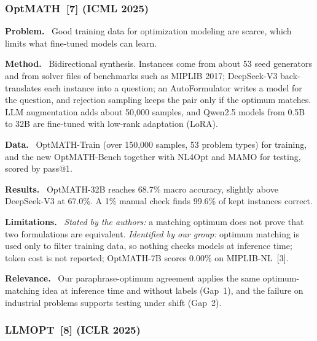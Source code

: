 \documentclass[11pt,a4paper]{article}
\newcommand{\elem}[1]{\par\noindent\textbf{#1.}~}
\begin{document}
\subsubsection[OptMATH (ICML 2025)]{OptMATH~[7] (ICML 2025)}

\elem{Problem} Good training data for optimization modeling are scarce, which limits what fine-tuned models can learn.
\elem{Method} Bidirectional synthesis. Instances come from about 53 seed generators and from solver files of benchmarks such as MIPLIB 2017; DeepSeek-V3 back-translates each instance into a question; an AutoFormulator writes a model for the question, and rejection sampling keeps the pair only if the optimum matches. LLM augmentation adds about 50,000 samples, and Qwen2.5 models from 0.5B to 32B are fine-tuned with low-rank adaptation (LoRA).
\elem{Data} OptMATH-Train (over 150,000 samples, 53 problem types) for training, and the new OptMATH-Bench together with NL4Opt and MAMO for testing, scored by pass@1.
\elem{Results} OptMATH-32B reaches 68.7\% macro accuracy, slightly above DeepSeek-V3 at 67.0\%. A 1\% manual check finds 99.6\% of kept instances correct.
\elem{Limitations} \textit{Stated by the authors:} a matching optimum does not prove that two formulations are equivalent. \textit{Identified by our group:} optimum matching is used only to filter training data, so nothing checks models at inference time; token cost is not reported; OptMATH-7B scores 0.00\% on MIPLIB-NL~[3].
\elem{Relevance} Our paraphrase-optimum agreement applies the same optimum-matching idea at inference time and without labels (Gap~1), and the failure on industrial problems supports testing under shift (Gap~2).

\subsubsection[LLMOPT (ICLR 2025)]{LLMOPT~[8] (ICLR 2025)}
\end{document}
